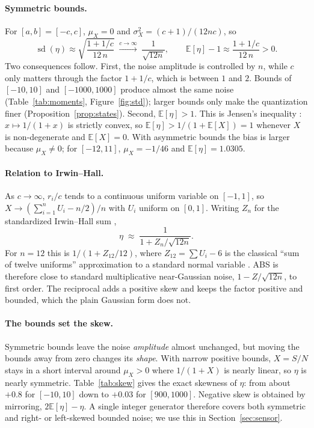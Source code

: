 \documentclass[10pt,a4paper]{article}
\theoremstyle{definition}
\theoremstyle{remark}
\newcommand{\E}{\mathbb{E}}
\begin{document}
\paragraph{Symmetric bounds.} For $[a,b]=[-c,c]$, $\mu_X=0$ and
$\sigma_X^2=(c+1)/(12nc)$, so
\begin{equation}
\operatorname{sd}(\eta)\approx\sqrt{\frac{1+1/c}{12\,n}}\;\xrightarrow{c\to\infty}\;
\frac{1}{\sqrt{12n}},\qquad
\E[\eta]-1\approx\frac{1+1/c}{12\,n}>0.
\label{eq:sym}
\end{equation}
Two consequences follow. First, the noise amplitude is controlled by $n$, while $c$ only
matters through the factor $1+1/c$, which is between $1$ and $2$. Bounds of $[-10,10]$ and
$[-1000,1000]$ produce almost the same noise (Table~\ref{tab:moments},
Figure~\ref{fig:std}); larger bounds only make the quantization finer
(Proposition~\ref{prop:states}). Second, $\E[\eta]>1$. This is Jensen's inequality
\cite{jensen}: $x\mapsto1/(1+x)$ is strictly convex, so
$\E[\eta]>1/(1+\E[X])=1$ whenever $X$ is non-degenerate and $\E[X]=0$. With asymmetric
bounds the bias is larger because $\mu_X\ne0$; for $[-12,11]$, $\mu_X=-1/46$ and
$\E[\eta]=1.0305$.

\paragraph{Relation to Irwin--Hall.} As $c\to\infty$, $r_i/c$ tends to a continuous
uniform variable on $[-1,1]$, so $X\to(\sum_{i=1}^n U_i-n/2)/n$ with $U_i$ uniform on
$[0,1]$. Writing $Z_n$ for the standardized Irwin--Hall sum \cite{irwin,hall},
\begin{equation}
\eta\;\approx\;\frac{1}{1+Z_n/\sqrt{12n}} .
\end{equation}
For $n=12$ this is $1/(1+Z_{12}/12)$, where $Z_{12}=\sum U_i-6$ is the classical
``sum of twelve uniforms'' approximation to a standard normal variable \cite{knuth}. ABS is
therefore close to standard multiplicative near-Gaussian noise, $1-Z/\sqrt{12n}$, to first
order. The reciprocal adds a positive skew and keeps the factor positive and bounded, which
the plain Gaussian form does not.

\paragraph{The bounds set the skew.} Symmetric bounds leave the noise \emph{amplitude} almost
unchanged, but moving the bounds away from zero changes its \emph{shape}. With narrow positive
bounds, $X=S/N$ stays in a short interval around $\mu_X>0$ where $1/(1+X)$ is nearly linear,
so $\eta$ is nearly symmetric. Table~\ref{tab:skew} gives the exact skewness of $\eta$: from
about $+0.8$ for $[-10,10]$ down to $+0.03$ for $[900,1000]$. Negative skew is obtained by
mirroring, $2\E[\eta]-\eta$. A single integer generator therefore covers both symmetric and
right- or left-skewed bounded noise; we use this in Section~\ref{sec:sensor}.
\end{document}
